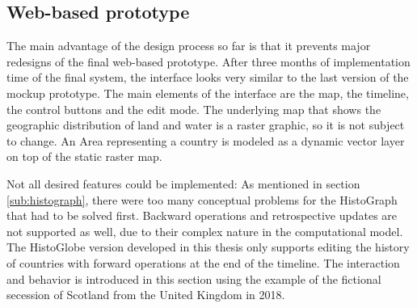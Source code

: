 
\subsection{Web-based prototype} %
\label{sub:web_based_prototype}

The main advantage of the design process so far is that it prevents major redesigns of the final web-based prototype. After three months of implementation time of the final system, the interface looks very similar to the last version of the mockup prototype. The main elements of the interface are the map, the timeline, the control buttons and the edit mode. The underlying map that shows the geographic distribution of land and water is a raster graphic, so it is not subject to change. An Area representing a country is modeled as a dynamic vector layer on top of the static raster map.

Not all desired features could be implemented:
As mentioned in section \ref{sub:histograph}, there were too many conceptual problems for the HistoGraph that had to be solved first.
Backward operations and retrospective updates are not supported as well, due to their complex nature in the computational model. The HistoGlobe version developed in this thesis only supports editing the history of countries with forward operations at the end of the timeline. The interaction and behavior is introduced in this section using the example of the fictional secession of Scotland from the United Kingdom in 2018.


